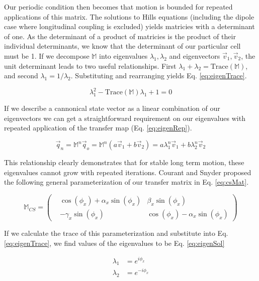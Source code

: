Our periodic condition then becomes that motion is bounded for repeated applications of this matrix. The solutions to Hills equations (including the dipole case where longitudinal coupling is excluded) yields matricies with a determinant of one. As the determinant of a product of matricies is the product of their individual determinants, we know that the determinant of our particular cell must be 1. If we decompose $\mathbb{M}$ into eigenvalues $\lambda_1, \lambda_2$ and eigenvectors $\vec{v}_1, \vec{v}_2$, the unit determinant leads to two useful relationships. First $\lambda_1 + \lambda_2 = \mathrm{Trace}(\mathbb{M})$, and second $\lambda_1 = 1/\lambda_2$. Substituting and rearranging yields Eq. \ref{eq:eigenTrace}.

\begin{equation} \label{eq:eigenTrace}
	\lambda_1^2 - \mathrm{Trace}(\mathbb{M})\lambda_1 + 1 = 0
\end{equation}

If we describe a cannonical state vector as a linear combination of our eigenvectors we can get a straightforward requirement on our eigenvalues with repeated application of the transfer map (Eq. \ref{eq:eigenRep}).

\begin{equation} \label{eq:eigenRep}
	\vec{q}_n = \mathbb{M}^n\vec{q}_o = \mathbb{M}^n(a \vec{v}_1 + b \vec{v}_2) = a \lambda_1^n \vec{v}_1 + b \lambda_2^n \vec{v}_2
\end{equation}

This relationship clearly demonstrates that for stable long term motion, these eigenvalues cannot grow with repeated iterations. Courant and Snyder proposed the following general parameterization of our transfer matrix in Eq. \ref{eq:csMat}.

\begin{equation} \label{eq:csMat}
	\mathbb{M}_{CS} = 
\begin{pmatrix}
&\cos{\left(\phi_x\right)} + \alpha_x\sin{\left(\phi_x\right)} &\beta_x\sin{\left(\phi_x\right)}\\
&-\gamma_x\sin{\left(\phi_x\right)} &\cos{\left(\phi_x\right)} - \alpha_x\sin{\left(\phi_x\right)}\end{pmatrix}
\end{equation}

If we calculate the trace of this parameterization and substitute into Eq. \ref{eq:eigenTrace}, we find values of the eigenvalues to be Eq. \ref{eq:eigenSol}

\begin{equation} \label{eq:eigenSol}
\begin{split}
	\lambda_1 &= e^{i\phi_x}\\
	\lambda_2 &= e^{-i\phi_x}\\
\end{split}
\end{equation}

